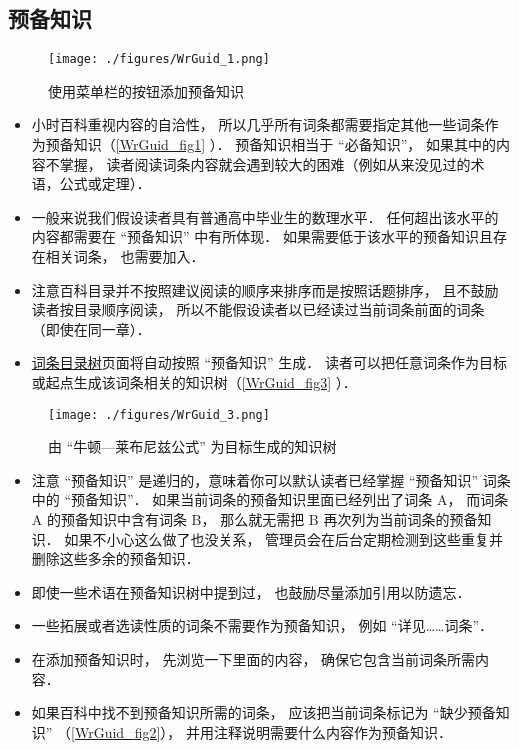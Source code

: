 \subsection{预备知识}
\begin{figure}[ht]
\centering
\texttt{[image: ./figures/WrGuid\_1.png]}
\caption{使用菜单栏的按钮添加预备知识} \label{WrGuid_fig1}
\end{figure}

\begin{itemize}
\item 小时百科重视内容的自洽性， 所以几乎所有词条都需要指定其他一些词条作为预备知识（\autoref{WrGuid_fig1} ）． 预备知识相当于 “必备知识”， 如果其中的内容不掌握， 读者阅读词条内容就会遇到较大的困难（例如从来没见过的术语，公式或定理）．
\item 一般来说我们假设读者具有普通高中毕业生的数理水平． 任何超出该水平的内容都需要在 “预备知识” 中有所体现． 如果需要低于该水平的预备知识且存在相关词条， 也需要加入．
\item 注意百科目录并不按照建议阅读的顺序来排序而是按照话题排序， 且不鼓励读者按目录顺序阅读， 所以不能假设读者以已经读过当前词条前面的词条（即使在同一章）．
\item \href{http://wuli.wiki/tree/}{词条目录树}页面将自动按照 “预备知识” 生成． 读者可以把任意词条作为目标或起点生成该词条相关的知识树（\autoref{WrGuid_fig3} ）．
\end{itemize}

\begin{figure}[ht]
\centering
\texttt{[image: ./figures/WrGuid\_3.png]}
\caption{由 “牛顿—莱布尼兹公式” 为目标生成的知识树} \label{WrGuid_fig3}
\end{figure}

\begin{itemize}
\item 注意 “预备知识” 是递归的，意味着你可以默认读者已经掌握 “预备知识” 词条中的 “预备知识”． 如果当前词条的预备知识里面已经列出了词条 A， 而词条 A 的预备知识中含有词条 B， 那么就无需把 B 再次列为当前词条的预备知识． 如果不小心这么做了也没关系， 管理员会在后台定期检测到这些重复并删除这些多余的预备知识．
\item 即使一些术语在预备知识树中提到过， 也鼓励尽量添加引用以防遗忘．
\item 一些拓展或者选读性质的词条不需要作为预备知识， 例如 “详见……词条”．
\item 在添加预备知识时， 先浏览一下里面的内容， 确保它包含当前词条所需内容．
\item 如果百科中找不到预备知识所需的词条， 应该把当前词条标记为 “缺少预备知识” （\autoref{WrGuid_fig2}）， 并用注释说明需要什么内容作为预备知识．
\end{itemize}

